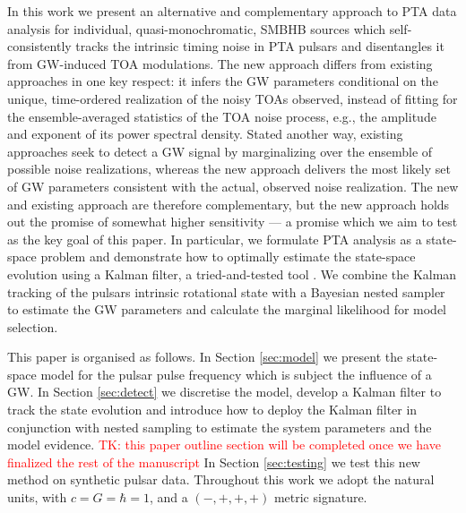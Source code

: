\documentclass[fleqn,usenatbib,useAMS]{mnras}
\begin{document}
In this work we present an alternative and complementary approach to PTA data analysis for individual, quasi-monochromatic, SMBHB sources which self-consistently tracks the intrinsic timing noise in PTA pulsars and disentangles it from GW-induced TOA modulations. The new approach differs from existing approaches in one key respect: it infers the GW parameters conditional on the unique, time-ordered realization of the noisy TOAs observed, instead of fitting for the ensemble-averaged statistics of the TOA noise process, e.g., the amplitude and exponent of its power spectral density. Stated another way, existing approaches seek to detect a GW signal by marginalizing over the ensemble of possible noise realizations, whereas the new approach delivers the most likely set of GW parameters consistent with the actual, observed noise realization. The new and existing approach are therefore complementary, but the new approach holds out the promise of somewhat higher sensitivity --- a promise which we aim to test as the key goal of this paper. In particular, we formulate PTA analysis as a state-space problem and demonstrate how to optimally estimate the state-space evolution using a Kalman filter, a tried-and-tested tool \citep{Kalman1,Meyers2021,Melatos2023}. We combine the Kalman tracking of the pulsars intrinsic rotational state with a Bayesian nested sampler \citep{Skilling, Ashton2022} to estimate the GW parameters and calculate the marginal likelihood for model selection. \newline 
 
\noindent This paper is organised as follows. In Section \ref{sec:model} we present the state-space model for the pulsar pulse frequency which is subject the influence of a GW. In Section \ref{sec:detect} we discretise the model, develop a Kalman filter to track the state evolution and introduce how to deploy the Kalman filter in conjunction with nested sampling to estimate the system parameters and the model evidence. \textcolor{red}{TK: this paper outline section will be completed once we have finalized the rest of the manuscript} In Section \ref{sec:testing} we test this new method on synthetic pulsar data. Throughout this work we adopt the natural units, with $c = G = \hbar = 1$, and a $(-,+,+,+)$ metric signature. \newline 






%
\end{document}
